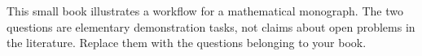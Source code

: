 \preface
This small book illustrates a workflow for a mathematical monograph. The two questions are elementary demonstration tasks, not claims about open problems in the literature. Replace them with the questions belonging to your book.
